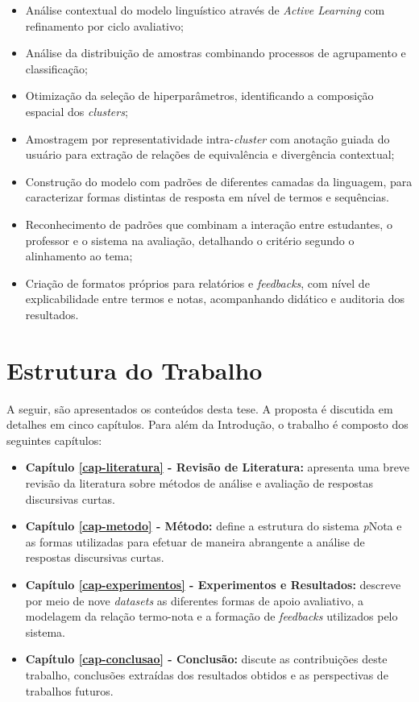 \begin{itemize}
  \item Análise contextual do modelo linguístico através de \textit{Active Learning} com refinamento por ciclo avaliativo;
  \item Análise da distribuição de amostras combinando processos de agrupamento e classificação;
  \item Otimização da seleção de hiperparâmetros, identificando a composição espacial dos \textit{clusters};
  \item Amostragem por representatividade intra-\textit{cluster} com anotação guiada do usuário para extração de relações de equivalência e divergência contextual;
  \item Construção do modelo com padrões de diferentes camadas da linguagem, para caracterizar formas distintas de resposta em nível de termos e sequências.
  \item Reconhecimento de padrões que combinam a interação entre estudantes, o professor e o sistema na avaliação, detalhando o critério segundo o alinhamento ao tema;
  \item Criação de formatos próprios para relatórios e \textit{feedbacks}, com nível de explicabilidade entre termos e notas, acompanhando didático e auditoria dos resultados.
\end{itemize}

\section{Estrutura do Trabalho}

A seguir, são apresentados os conteúdos desta tese. A proposta é discutida em detalhes em cinco capítulos. Para além da Introdução, o trabalho é composto dos seguintes capítulos:

\begin{itemize}
\item \textbf{Capítulo \ref{cap-literatura} - Revisão de Literatura:} apresenta uma breve revisão da literatura sobre métodos de análise e avaliação de respostas discursivas curtas.

\item \textbf{Capítulo \ref{cap-metodo} - Método:} define a estrutura do sistema \textit{p}Nota e as formas utilizadas para efetuar de maneira abrangente a análise de respostas discursivas curtas.

\item \textbf{Capítulo \ref{cap-experimentos} - Experimentos e Resultados:} descreve por meio de nove \textit{datasets} as diferentes formas de apoio avaliativo, a modelagem da relação termo-nota e a formação de \textit{feedbacks} utilizados pelo sistema.

\item \textbf{Capítulo \ref{cap-conclusao} - Conclusão:} discute as contribuições deste trabalho, conclusões extraídas dos resultados obtidos e as perspectivas de trabalhos futuros.

\end{itemize}

